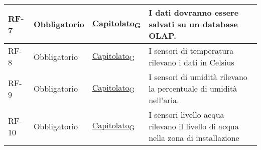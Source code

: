 \begin{longtable}{|>{\centering\arraybackslash}m{}|>{\centering\arraybackslash}m{}|>{\centering\arraybackslash}m{}|>{\centering\arraybackslash}m{}|}
	RF-7            & Obbligatorio        & \href{https://7last.github.io/docs/rtb/documentazione-interna/glossario\#capitolato}{Capitolato\textsubscript{G}} & I dati dovranno essere salvati su un database OLAP.                                                                                                                                                                                                                                                                                                                                                                                                                                                  \\\hline
	RF-8            & Obbligatorio        & \href{https://7last.github.io/docs/rtb/documentazione-interna/glossario\#capitolato}{Capitolato\textsubscript{G}} & I sensori di temperatura rilevano i dati in Celsius                                                                                                                                                                                                                                                                                                                                                                                                                                                  \\\hline
	RF-9            & Obbligatorio        & \href{https://7last.github.io/docs/rtb/documentazione-interna/glossario\#capitolato}{Capitolato\textsubscript{G}} & I sensori di umidità rilevano la percentuale di umidità nell’aria.                                                                                                                                                                                                                                                                                                                                                                                                                                   \\\hline
	RF-10           & Obbligatorio        & \href{https://7last.github.io/docs/rtb/documentazione-interna/glossario\#capitolato}{Capitolato\textsubscript{G}} & I sensori livello acqua rilevano il livello di acqua nella zona di installazione                                                                                                                                                                                                                                                                                                                                                                                                                     \\\hline

\end{longtable}
